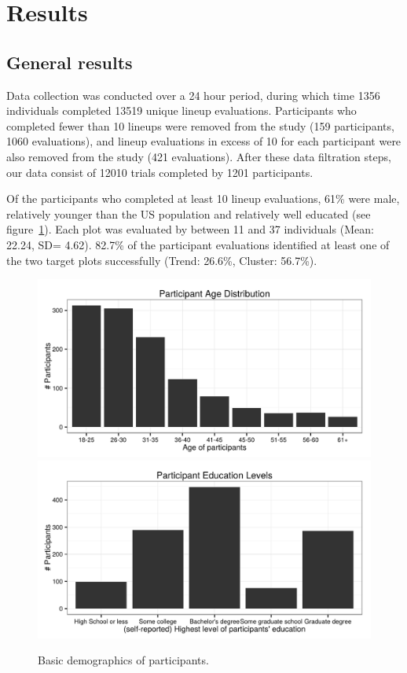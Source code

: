 \documentclass[11pt]{isuthesis}\usepackage[]{graphicx}\usepackage[]{color}
\newenvironment{knitrout}{}{} %
\begin{document}
\section{Results}\label{sec:Results}


\subsection{General results}
Data collection was conducted over a 24 hour period, 
during which time 1356 individuals completed 13519 unique lineup evaluations. 
Participants who completed fewer than 10 lineups were removed from the study (159 participants, 1060 evaluations), and lineup evaluations in excess of 10 for each participant were also removed from the study (421 evaluations). 
After these data filtration steps, our data consist of 12010 trials completed by 1201 participants. 

Of the participants who completed at least 10 lineup evaluations, 61\% were male, relatively younger than the US population and relatively well educated (see figure~\ref{fig:demographics}). 
Each plot was evaluated by between 11 and 37 individuals 
(Mean: 22.24, SD= 4.62).
82.7\% of the participant evaluations identified at least one of the two target plots successfully (Trend: 26.6\%, Cluster: 56.7\%). 

\begin{figure}[ht]
\begin{knitrout}
\color{fgcolor}

{\centering \includegraphics[width=.48\linewidth]{Figure/FeatureHierarchy/fig-demographics-1} 
\includegraphics[width=.48\linewidth]{Figure/FeatureHierarchy/fig-demographics-2} 

}



\end{knitrout}
\caption[Basic demographics of participants]{\label{fig:demographics}Basic demographics of participants.}
\end{figure}
\end{document}
